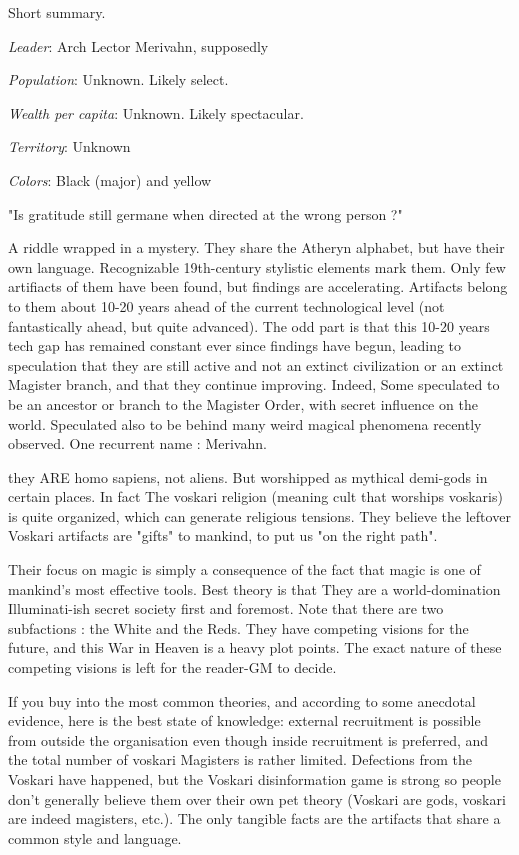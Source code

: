 Short summary.


\textit{Leader}: Arch Lector Merivahn, supposedly

\textit{Population}: Unknown. Likely select.

\textit{Wealth per capita}: Unknown. Likely spectacular.

\textit{Territory}: Unknown
    
\textit{Colors}: Black (major) and yellow






\begin{rpg-quotebox}
	"Is gratitude still germane when directed at the wrong person ?"
\end{rpg-quotebox}

A riddle wrapped in a mystery. They share the Atheryn alphabet, but have their own language. Recognizable 19th-century stylistic elements mark them. Only few artifiacts of them have been found, but findings are accelerating. Artifacts belong to them about 10-20 years ahead of the current technological level (not fantastically ahead, but quite advanced). The odd part is that this 10-20 years tech gap has remained constant ever since findings have begun, leading to speculation that they are still active and not an extinct civilization or an extinct Magister branch, and that they continue improving. Indeed, Some speculated to be an ancestor or branch to the Magister Order, with secret influence on the world. Speculated also to be behind many weird magical phenomena recently observed. One recurrent name : Merivahn.

they ARE homo sapiens, not aliens. But worshipped as mythical demi-gods in certain places. In fact The voskari religion (meaning cult that worships voskaris) is quite organized, which can generate religious tensions. They believe the leftover Voskari artifacts are "gifts" to mankind, to put us "on the right path". 
 

Their focus on magic is simply a consequence of the fact that magic is one of mankind's most effective tools. Best theory is that They are a world-domination Illuminati-ish secret society first and foremost.
Note that there are two subfactions : the White and the Reds. They have competing visions for the future, and this War in Heaven is a heavy plot points. The exact nature of these competing visions is left for the reader-GM to decide.

If you buy into the most common theories, and according to some anecdotal evidence, here is the best state of knowledge: external recruitment is possible from outside the organisation even though inside recruitment is preferred, and the total number of voskari Magisters is rather limited. Defections from the Voskari have happened, but the Voskari disinformation game is strong so people don't generally believe them over their own pet theory (Voskari are gods, voskari are indeed magisters, etc.). The only tangible facts are the artifacts that share a common style and language. 





